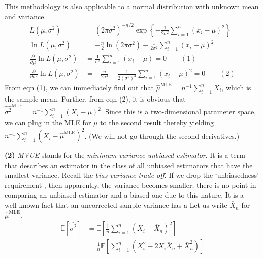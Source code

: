 \documentclass[answers]{exam}
\begin{document}
\begin{questions}
\begin{solution}
      This methodology is also applicable to a normal distribution with unknown mean and variance.
      \begin{align*}
         L\left(\mu, \sigma^{2}\right) &= \left(2\pi \sigma^{2} \right)^{-n/2}\exp \left\{-\frac{1}{2\sigma^{2}}\sum_{i=1}^{n}\left(x_{i}-\mu\right)^{2} \right\}\\
         \ln L\left(\mu, \sigma^{2}\right) &= -\frac{n}{2}\ln \left(2\pi\sigma^{2}\right) - \frac{1}{2\sigma^{2}}\sum_{i=1}^{n}\left(x_{i}-\mu\right)^{2}\\
         \frac{\partial}{\partial \mu}\ln L\left(\mu, \sigma^{2}\right) &= \frac{1}{\sigma^{2}}\sum_{i=1}^{n}\left(x_{i}-\mu\right) = 0 \qquad (1)\\
         \frac{\partial}{\partial \sigma^{2}}\ln L\left(\mu, \sigma^{2}\right) &= -\frac{n}{2\sigma^{2}} +\frac{1}{2\left(\sigma^{2}\right)^{2}}\sum_{i=1}^{n}\left(x_{i}-\mu\right)^{2} = 0 \qquad (2)
      \end{align*}
      From eqn (1), we can immediately find out that $\hat{\mu}^{\text{MLE}} = n^{-1}\sum_{i=1}^{n}X_{i}$, which is the sample mean. Further, from eqn (2), it is obvious that $\widehat{\sigma^{2}}^{\text{MLE}}=n^{-1}\sum_{i=1}^{n}\left(X_{i}-\mu\right)^{2}$. Since this is a two-dimensional parameter space, we can plug in the MLE for $\mu$ to the second result thereby yielding $n^{-1}\sum_{i=1}^{n}\left(X_{i} - \hat{\mu}^{\text{MLE}}\right)^{2}$. (We will not go through the second derivatives.)
   \end{solution}
   \begin{solution}
      \textbf{(2)} \emph{MVUE} stands for the \emph{minimum variance unbiased estimator}. It is a term that describes an estimator in the class of all unbiased estimators that have the smallest variance. Recall the \emph{bias-variance trade-off}. If we drop the `unbiasedness' requirement , then apparently, the variance becomes smaller; there is no point in comparing an unbiased estimator and a biased one due to this nature. It is a well-known fact that an uncorrected sample variance has a Let us write $\overline{X}_{n}$ for $\hat{\mu}^{\text{MLE}}$.
      \begin{align*}
         \mathbb{E}\left[\widehat{\sigma^{2}}\right] &= \mathbb{E}\left[\frac{1}{n}\sum_{i=1}^{n}\left(X_{i}-\overline{X}_{n}\right)^{2} \right]\\
         &= \frac{1}{n}\mathbb{E}\left[\sum_{i=1}^{n}\left(X_{i}^{2} - 2X_{i}\overline{X}_{n} + \overline{X}_{n}^{2} \right) \right]
      \end{align*}
   \end{solution}
\end{questions}
\end{document}
